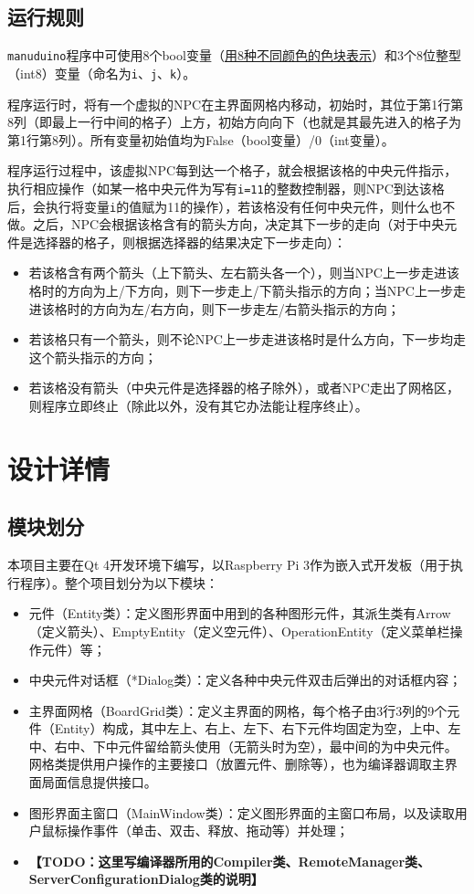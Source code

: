 \documentclass[UTF8]{ctexart}
\begin{document}
\subsection{运行规则}
\texttt{manuduino}程序中可使用8个bool变量（\uline{用8种不同颜色的色块表示}）和3个8位整型（int8）变量（命名为\texttt{i}、\texttt{j}、\texttt{k}）。\par
程序运行时，将有一个虚拟的NPC在主界面网格内移动，初始时，其位于第1行第8列（即最上一行中间的格子）上方，初始方向向下（也就是其最先进入的格子为第1行第8列）。所有变量初始值均为False（bool变量）/0（int变量）。\par
程序运行过程中，该虚拟NPC每到达一个格子，就会根据该格的中央元件指示，执行相应操作（如某一格中央元件为写有\texttt{i=11}的整数控制器，则NPC到达该格后，会执行将变量\texttt{i}的值赋为11的操作），若该格没有任何中央元件，则什么也不做。之后，NPC会根据该格含有的箭头方向，决定其下一步的走向（对于中央元件是选择器的格子，则根据选择器的结果决定下一步走向）：
\begin{itemize}
    \item 若该格含有两个箭头（上下箭头、左右箭头各一个），则当NPC上一步走进该格时的方向为上/下方向，则下一步走上/下箭头指示的方向；当NPC上一步走进该格时的方向为左/右方向，则下一步走左/右箭头指示的方向；
    \item 若该格只有一个箭头，则不论NPC上一步走进该格时是什么方向，下一步均走这个箭头指示的方向；
    \item 若该格没有箭头（中央元件是选择器的格子除外），或者NPC走出了网格区，则程序立即终止（除此以外，没有其它办法能让程序终止）。
\end{itemize}

\section{设计详情}
\subsection{模块划分}
本项目主要在Qt 4开发环境下编写，以Raspberry Pi 3作为嵌入式开发板（用于执行程序）。整个项目划分为以下模块：
\begin{itemize}
	\item 元件（Entity类）：定义图形界面中用到的各种图形元件，其派生类有Arrow（定义箭头）、EmptyEntity（定义空元件）、OperationEntity（定义菜单栏操作元件）等；
	\item 中央元件对话框（*Dialog类）：定义各种中央元件双击后弹出的对话框内容；
	\item 主界面网格（BoardGrid类）：定义主界面的网格，每个格子由3行3列的9个元件（Entity）构成，其中左上、右上、左下、右下元件均固定为空，上中、左中、右中、下中元件留给箭头使用（无箭头时为空），最中间的为中央元件。网格类提供用户操作的主要接口（放置元件、删除等），也为编译器调取主界面局面信息提供接口。
	\item 图形界面主窗口（MainWindow类）：定义图形界面的主窗口布局，以及读取用户鼠标操作事件（单击、双击、释放、拖动等）并处理；
	\item \textbf{\Large 【TODO：这里写编译器所用的Compiler类、RemoteManager类、ServerConfigurationDialog类的说明】}
\end{itemize}
\end{document}
